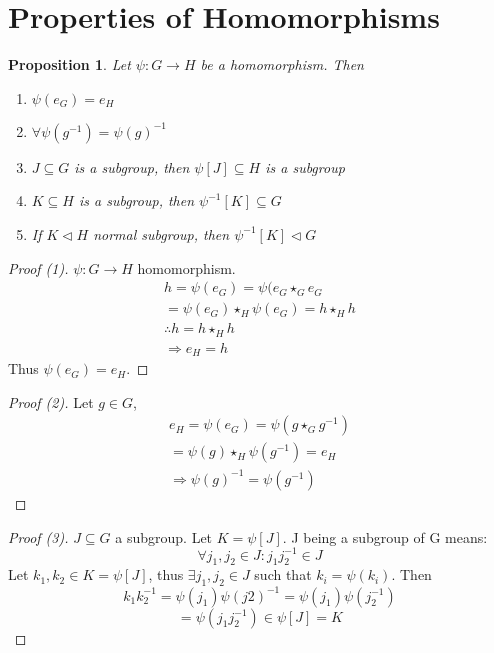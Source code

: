 \documentclass[12pt]{article}
\newtheorem{proposition}{Proposition}
\begin{document}
\section*{Properties of Homomorphisms} 
\begin{proposition}
    Let \(\psi: G \to H\) be a homomorphism. Then 
    \begin{enumerate}
        \item \(\psi(e_G) = e_H\)
        \item \(\forall \psi(g^{-1}) = \psi(g)^{-1}\)
        \item \(J \subseteq G\) is a subgroup, then \(\psi[J] \subseteq H\) is a subgroup
        \item \(K \subseteq H\) is a subgroup, then \(\psi^{-1}[K] \subseteq G\)
        \item If \(K \triangleleft H\) normal subgroup, 
            then \(\psi^{-1}[K] \triangleleft G\)
    \end{enumerate}
\end{proposition}
\begin{proof}[Proof (1)]
    \(\psi: G \to H\) homomorphism. 
    \begin{gather*}
        h = \psi(e_G) = \psi(e_G \star_G e_G \\ 
        = \psi(e_G) \star_H \psi(e_G) = h\star_H h \\ 
        \therefore h = h \star_H h \\ 
        \Rightarrow e_H = h 
    \end{gather*}
    Thus \(\psi(e_G) = e_H\). 
\end{proof}
\begin{proof}[Proof (2)]
    Let \(g\in G\), 
    \begin{gather*}
        e_H = \psi(e_G) = \psi(g \star_G g^{-1}) \\ 
        = \psi(g) \star_H \psi(g^{-1}) = e_H \\ 
        \Rightarrow \psi(g)^{-1} = \psi(g^{-1})
    \end{gather*}
\end{proof}
\begin{proof}[Proof (3)]
    \(J \subseteq G\) a subgroup. Let \(K = \psi[J]\). 
    J being a subgroup of G means: 
    \[ 
        \forall j_1, j_2 \in J : j_1 j_2^{-1} \in J 
    \]
    Let \(k_1, k_2 \in K = \psi[J]\), thus \(\exists j_1, j_2 \in J\) such that 
    \(k_i = \psi(k_i)\). Then  
    \[ 
        k_1k_2^{-1} = \psi(j_1)\psi(j2)^{-1} = \psi(j_1)\psi(j_2^{-1})
    \]
    \[ 
        = \psi(j_1j_2^{-1}) \in \psi[J] = K
    \]
\end{proof}
\end{document}
